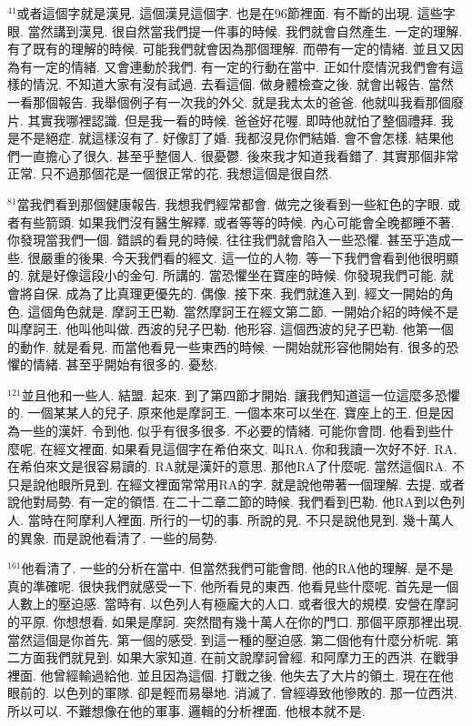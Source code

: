 \documentclass{book}
\begin{document}
$^{41}$或者這個字就是漢見.
這個漢見這個字.
也是在96節裡面.
有不斷的出現.
這些字眼.
當然講到漢見.
很自然當我們提一件事的時候.
我們就會自然產生.
一定的理解.
有了既有的理解的時候.
可能我們就會因為那個理解.
而帶有一定的情緒.
並且又因為有一定的情緒.
又會連動於我們.
有一定的行動在當中.
正如什麼情況我們會有這樣的情況.
不知道大家有沒有試過.
去看這個.
做身體檢查之後.
就會出報告.
當然一看那個報告.
我舉個例子有一次我的外父.
就是我太太的爸爸.
他就叫我看那個廢片.
其實我哪裡認識.
但是我一看的時候.
爸爸好花喔.
即時他就怕了整個禮拜.
我是不是絕症.
就這樣沒有了.
好像訂了婚.
我都沒見你們結婚.
會不會怎樣.
結果他們一直擔心了很久.
甚至乎整個人.
很憂鬱.
後來我才知道我看錯了.
其實那個非常正常.
只不過那個花是一個很正常的花.
我想這個是很自然.

$^{81}$當我們看到那個健康報告.
我想我們經常都會.
做完之後看到一些紅色的字眼.
或者有些箭頭.
如果我們沒有醫生解釋.
或者等等的時候.
內心可能會全晚都睡不著.
你發現當我們一個.
錯誤的看見的時候.
往往我們就會陷入一些恐懼.
甚至乎造成一些.
很嚴重的後果.
今天我們看的經文.
這一位的人物.
等一下我們會看到他很明顯的.
就是好像這段小的金句.
所講的.
當恐懼坐在寶座的時候.
你發現我們可能.
就會將自保.
成為了比真理更優先的.
偶像.
接下來.
我們就進入到.
經文一開始的角色.
這個角色就是.
摩訶王巴勒.
當然摩訶王在經文第二節.
一開始介紹的時候不是叫摩訶王.
他叫他叫做.
西波的兒子巴勒.
他形容.
這個西波的兒子巴勒.
他第一個的動作.
就是看見.
而當他看見一些東西的時候.
一開始就形容他開始有.
很多的恐懼的情緒.
甚至乎開始有很多的.
憂愁.

$^{121}$並且他和一些人.
結盟.
起來.
到了第四節才開始.
讓我們知道這一位這麼多恐懼的.
一個某某人的兒子.
原來他是摩訶王.
一個本來可以坐在.
寶座上的王.
但是因為一些的漢奸.
令到他.
似乎有很多很多.
不必要的情緒.
可能你會問.
他看到些什麼呢.
在經文裡面.
如果看見這個字在希伯來文.
叫RA.
你和我讀一次好不好.
RA.
在希伯來文是很容易讀的.
RA就是漢奸的意思.
那他RA了什麼呢.
當然這個RA.
不只是說他眼所見到.
在經文裡面常常用RA的字.
就是說他帶著一個理解.
去提.
或者說他對局勢.
有一定的領悟.
在二十二章二節的時候.
我們看到巴勒.
他RA到以色列人.
當時在阿摩利人裡面.
所行的一切的事.
所說的見.
不只是說他見到.
幾十萬人的異象.
而是說他看清了.
一些的局勢.

$^{161}$他看清了.
一些的分析在當中.
但當然我們可能會問.
他的RA他的理解.
是不是真的準確呢.
很快我們就感受一下.
他所看見的東西.
他看見些什麼呢.
首先是一個人數上的壓迫感.
當時有.
以色列人有極龐大的人口.
或者很大的規模.
安營在摩訶的平原.
你想想看.
如果是摩訶.
突然間有幾十萬人在你的門口.
那個平原那裡出現.
當然這個是你首先.
第一個的感受.
到這一種的壓迫感.
第二個他有什麼分析呢.
第二方面我們就見到.
如果大家知道.
在前文說摩訶曾經.
和阿摩力王的西洪.
在戰爭裡面.
他曾經輸過給他.
並且因為這個.
打戰之後.
他失去了大片的領土.
現在在他眼前的.
以色列的軍隊.
卻是輕而易舉地.
消滅了.
曾經導致他慘敗的.
那一位西洪.
所以可以.
不難想像在他的軍事.
邏輯的分析裡面.
他根本就不是.
\end{document}
